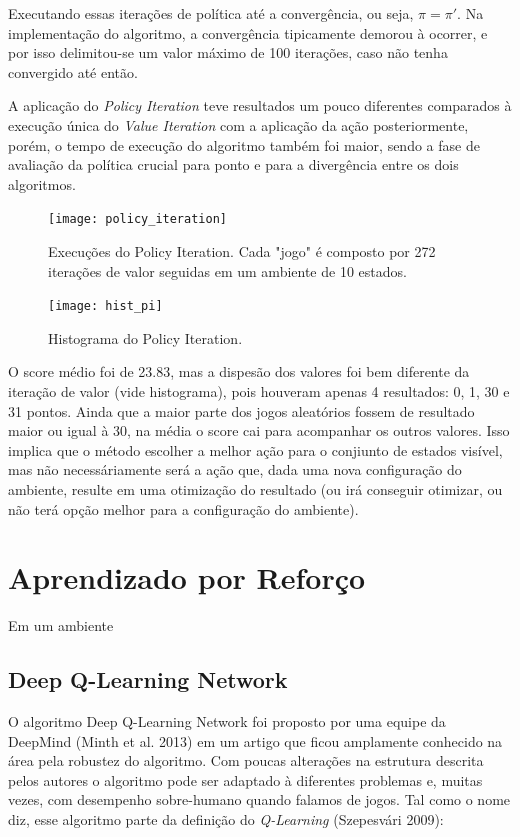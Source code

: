 \documentclass[letterpaper]{article} %
\begin{document}
Executando essas iterações de política até a convergência, ou seja, $\pi = \pi'$. Na implementação do algoritmo, a convergência tipicamente demorou à ocorrer, e por isso delimitou-se um valor máximo de 100 iterações, caso não tenha convergido até então.

A aplicação do \textit{Policy Iteration} teve resultados um pouco diferentes  comparados à execução única do \textit{Value Iteration} com a aplicação da ação posteriormente, porém, o tempo de execução do algoritmo também foi maior, sendo a fase de avaliação da política crucial para ponto e para a divergência entre os dois algoritmos. 

\begin{figure}[h]
	\center
	\texttt{[image: policy\_iteration]}
    \caption{Execuções do Policy Iteration. Cada "jogo" é composto por 272 iterações de valor seguidas em um ambiente de 10 estados.}
\end{figure}


\begin{figure}[h]
	\center
	\texttt{[image: hist\_pi]}
    \caption{Histograma do Policy Iteration.}
\end{figure}

O score médio foi de 23.83, mas a dispesão dos valores foi bem diferente da iteração de valor (vide histograma), pois houveram apenas 4 resultados: 0, 1, 30 e 31 pontos. Ainda que a maior parte dos jogos aleatórios fossem de resultado maior ou igual à 30, na média o score cai para acompanhar os outros valores. Isso implica que o método escolher a melhor ação para o conjiunto de estados visível, mas não necessáriamente será a ação que, dada uma nova configuração do ambiente, resulte em uma otimização do resultado (ou irá conseguir otimizar, ou não terá opção melhor para a configuração do ambiente).

\section{Aprendizado por Reforço}
Em um ambiente 

\subsection{Deep Q-Learning Network}
O algoritmo Deep Q-Learning Network foi proposto por uma equipe da DeepMind (Minth et al. 2013) em um artigo que ficou amplamente conhecido na área pela robustez do algoritmo. Com poucas alterações na estrutura descrita pelos autores o algoritmo pode ser adaptado à diferentes problemas e, muitas vezes, com desempenho sobre-humano quando falamos de jogos. Tal como o nome diz, esse algoritmo parte da definição do \textit{Q-Learning} (Szepesvári 2009):
\end{document}

